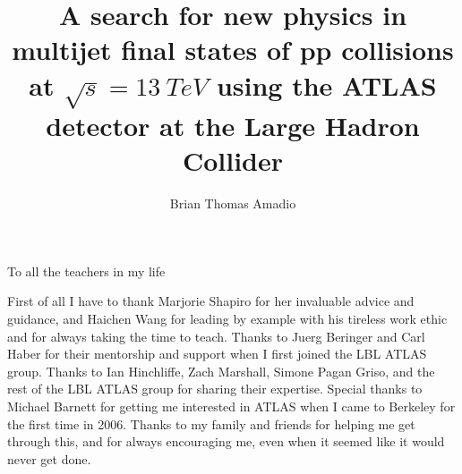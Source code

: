 \documentclass{ucbthesis}
\begin{document}

\title{A search for new physics in multijet
  final states of pp collisions at $\sqrt{s} = 13~TeV$ using the ATLAS
  detector at the Large Hadron Collider}

\author{Brian Thomas Amadio}


\maketitle
\copyrightpage



\begin{frontmatter}

\begin{dedication}
\null\vfil
\begin{center}

To all the teachers in my life
    \\\vspace{12pt}

\end{center}
\vfil\null
\end{dedication}


\tableofcontents
\clearpage
\listoffigures
\clearpage
\listoftables

\begin{acknowledgements}

First of all I have to thank Marjorie Shapiro for her invaluable advice and guidance, and Haichen Wang for leading by example with his tireless work ethic and for always taking the time to teach.
Thanks to Juerg Beringer and Carl Haber for their mentorship and support when I first joined the LBL ATLAS group.
Thanks to Ian Hinchliffe, Zach Marshall, Simone Pagan Griso, and the rest of the LBL ATLAS group for sharing their expertise.
Special thanks to Michael Barnett for getting me interested in ATLAS when I came to Berkeley for the first time in 2006.
Thanks to my family and friends for helping me get through this, and for always encouraging me, even when it seemed like it would never get done.

\end{acknowledgements}

\end{frontmatter}
\end{document}
